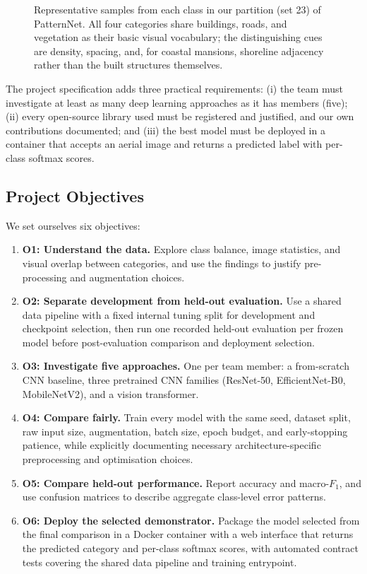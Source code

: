 \documentclass[11pt,twoside,a4paper]{article}
\begin{document}
\begin{figure}[htbp]
    \caption{Representative samples from each class in our partition (set 23) of PatternNet. All four categories share buildings, roads, and vegetation as their basic visual vocabulary; the distinguishing cues are density, spacing, and, for coastal mansions, shoreline adjacency rather than the built structures themselves.}
    \label{fig:class-samples}
\end{figure}

The project specification adds three practical requirements: (i) the team must
investigate at least as many deep learning approaches as it has members
(five); (ii) every open-source library used must be registered and justified,
and our own contributions documented; and (iii) the best model must be
deployed in a container that accepts an aerial image and returns a predicted
label with per-class softmax scores.

\subsection{Project Objectives}
We set ourselves six objectives:

\begin{enumerate}
  \item \textbf{O1: Understand the data.} Explore class balance, image
  statistics, and visual overlap between categories, and use the findings to
  justify pre-processing and augmentation choices.
  \item \textbf{O2: Separate development from held-out evaluation.} Use a
  shared data pipeline with a fixed internal tuning split for development and
  checkpoint selection, then run one recorded held-out evaluation per frozen
  model before post-evaluation comparison and deployment selection.
  \item \textbf{O3: Investigate five approaches.} One per team member: a
  from-scratch CNN baseline, three pretrained CNN families (ResNet-50,
  EfficientNet-B0, MobileNetV2), and a vision transformer.
  \item \textbf{O4: Compare fairly.} Train every model with the same seed,
  dataset split, raw input size, augmentation, batch size, epoch budget, and
  early-stopping patience, while explicitly documenting necessary
  architecture-specific preprocessing and optimisation choices.
  \item \textbf{O5: Compare held-out performance.} Report accuracy and
  macro-$F_1$, and use confusion matrices to describe aggregate class-level
  error patterns.
  \item \textbf{O6: Deploy the selected demonstrator.} Package the model
  selected from the final comparison in a Docker
  container with a web interface that returns the predicted category and
  per-class softmax scores, with automated contract tests covering the shared data
  pipeline and training entrypoint.
\end{enumerate}
\end{document}
